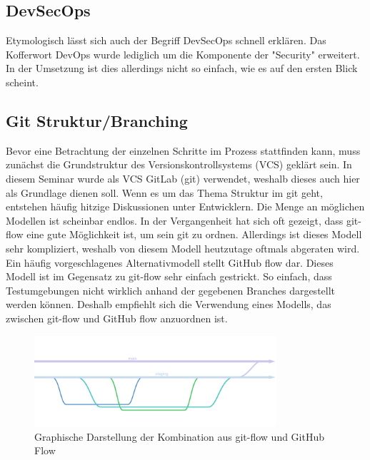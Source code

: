 \subsection{DevSecOps}

Etymologisch lässt sich auch der Begriff DevSecOps schnell erklären.
Das Kofferwort DevOps wurde lediglich um die Komponente der "Security" erweitert.
In der Umsetzung ist dies allerdings nicht so einfach, wie es auf den ersten Blick scheint.

\subsection{Git Struktur/Branching}

Bevor eine Betrachtung der einzelnen Schritte im Prozess stattfinden kann, muss zunächst die Grundstruktur des Versionskontrollsystems (VCS) geklärt sein.
In diesem Seminar wurde als VCS GitLab (git) verwendet, weshalb dieses auch hier als Grundlage dienen soll.
Wenn es um das Thema Struktur im git geht, entstehen häufig hitzige Diskussionen unter Entwicklern.
Die Menge an möglichen Modellen ist scheinbar endlos.
In der Vergangenheit hat sich oft gezeigt, dass git-flow\cite{SuccessfulGitBranching} eine gute Möglichkeit ist, um sein git zu ordnen.
Allerdings ist dieses Modell sehr kompliziert, weshalb von diesem Modell heutzutage oftmals abgeraten wird.
Ein häufig vorgeschlagenes Alternativmodell stellt GitHub flow\cite{UnderstandingGitHubFlow} dar.
Dieses Modell ist im Gegensatz zu git-flow sehr einfach gestrickt.
So einfach, dass Testumgebungen nicht wirklich anhand der gegebenen Branches dargestellt werden können.
Deshalb empfiehlt sich die Verwendung eines Modells, das zwischen git-flow und GitHub flow anzuordnen ist.
\begin{figure}[H]
    \includegraphics[width=0.8\textwidth]{img/branching}
    \centering
    \caption{Graphische Darstellung der Kombination aus git-flow und GitHub Flow}
    \label{fig:branchingModel}
\end{figure}


